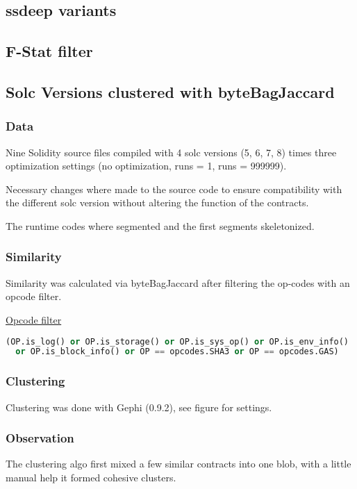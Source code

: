 \documentclass[../main.tex]{subfiles}
\begin{document}

\subsection{ssdeep variants}

\subsection{F-Stat filter}


\subsection{Solc Versions clustered with byteBagJaccard}

\subsubsection{Data}

Nine Solidity source files compiled with 4 solc versions (5, 6, 7, 8) times three optimization
settings (no optimization, runs = 1, runs = 999999).

Necessary changes where made to the source code to ensure compatibility with the different solc
version without altering the function of the contracts.

The runtime codes where segmented and the first segments skeletonized.

\subsubsection{Similarity}
Similarity was calculated via byteBagJaccard after filtering the op-codes with an opcode filter.

\underline{Opcode filter}
\begin{lstlisting}[basicstyle=\ttfamily,language=Python]
(OP.is_log() or OP.is_storage() or OP.is_sys_op() or OP.is_env_info()
  or OP.is_block_info() or OP == opcodes.SHA3 or OP == opcodes.GAS)
\end{lstlisting}

\subsubsection{Clustering}
Clustering was done with Gephi (0.9.2), see figure for settings.

\subsubsection{Observation}
The clustering algo first mixed a few similar contracts into one blob, with a little manual help
it formed cohesive clusters.
\end{document}
